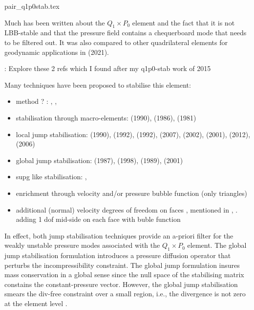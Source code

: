 \begin{flushright} {\tiny {\color{gray} pair\_q1p0stab.tex}} \end{flushright}

Much has been written about the $Q_1\times P_0$ element and the fact that it is not LBB-stable
and that the pressure field contains a chequerboard mode that needs to be filtered out. 
It was also compared to other quadrilateral elements for geodynamic applications 
in \textcite{thba21} (2021).

\Literature: Explore these 2 refs which I found after my q1p0-stab work of 2015 \cite{chke20,eguc03}

Many techniques have been proposed to stabilise this element:

\begin{itemize}
\item method ? : \cite{bbgs04},  \cite{bodg06} , \cite{bogl07}
\item stabilisation through macro-elements: 
\textcite{fobo90} (1990), \textcite{leru86} (1986), \textcite{leta81} (1981)
\item local jump stabilisation: 
\textcite{sike90} (1990), \textcite{kesi92} (1992), \textcite{vibo92} (1992),
\textcite{qizh07} (2007), \textcite{chri02} (2002), \textcite{chco01} (2001),
\textcite{lisi12} (2012), \textcite{lica06} (2006)
\item global jump stabilisation: 
\textcite{hufr87} (1987), \textcite{nosi98} (1998), \textcite{dowa89} (1989),
\textcite{chco01} (2001)
\item supg like stabilisation: \cite{teos00}, \cite{tezd92,hufb86}
\item enrichment through velocity and/or pressure bubble function \cite{frol03}(only triangles)
\item additional (normal) velocity degrees of freedom on faces \cite{fofo85}, 
mentioned in \cite{sofo87}, \cite{fort81}.
adding 1 dof mid-side on each face with buble function \cite{rota87}
\end{itemize}

In effect, both jump stabilisation techniques provide an a-priori filter 
for the weakly unstable pressure modes associated 
with the $Q_1\times P_0$ element. The global jump stabilisation formulation 
introduces a pressure diffusion operator that perturbs the incompressibility constraint. 
The global jump formulation insures mass conservation in a global  
sense since the null space of the stabilising matrix constains the constant-pressure vector. 
However, the global jump stabilisation smears the div-free constraint over a small 
region, i.e., the divergence is not zero at the element level \cite{chri00}.

